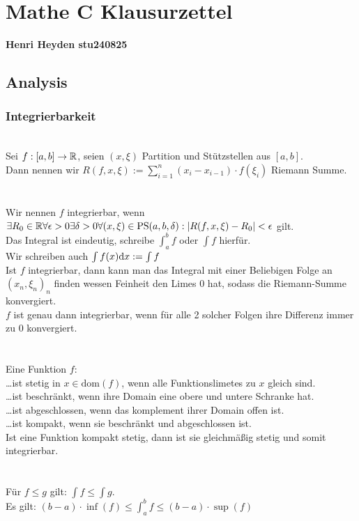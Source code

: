 


\section*{Mathe C Klausurzettel}
\textbf{Henri Heyden \gedanke stu240825}
\subsection*{Analysis}
\subsubsection*{Integrierbarkeit}
\\
Sei \(f : [a,b] \rightarrow \mathbb R\), seien \((x, \xi)\) Partition und Stützstellen aus \([a,b]\).\\
Dann nennen wir \(R(f,x,\xi) := \sum_{i=1}^n (x_i - x_{i-1}) \cdot f(\xi_i)\) Riemann Summe. \\ \\
\\
Wir nennen \(f\) integrierbar, wenn\\\(\exists R_0 \in \mathbb R \forall \epsilon > 0 \exists \delta > 0 \forall(x,\xi) \in \text{PS}(a,b,\delta): |R(f,x,\xi) - R_0| < \epsilon\) gilt. \\
Das Integral ist eindeutig, schreibe \(\int_{a}^{b} f\) oder \(\int f\) hierfür. \\
Wir schreiben auch \(\int f(x)\text dx := \int f\) \\
Ist \(f\) integrierbar, dann kann man das Integral mit einer Beliebigen Folge an \((x_n,\xi_n)_n\) finden wessen Feinheit den Limes 0 hat, sodass die Riemann-Summe konvergiert. \\
\(f\) ist genau dann integrierbar, wenn für alle 2 solcher Folgen ihre Differenz immer zu 0 konvergiert. \\ \\
 \\
Eine Funktion \(f\): \\
\dots ist stetig in \(x \in \text{dom}(f)\), wenn alle Funktionslimetes zu \(x\) gleich sind.\\
\dots ist beschränkt, wenn ihre Domain eine obere und untere Schranke hat. \\
\dots ist abgeschlossen, wenn das komplement ihrer Domain offen ist. \\
\dots ist kompakt, wenn sie beschränkt und abgeschlossen ist. \\
Ist eine Funktion kompakt stetig, dann ist sie gleichmäßig stetig und somit integrierbar. \\ \\
 \\
Für \(f \le g\) gilt: \(\int f \le \int g\). \\
Es gilt: \((b-a) \cdot \inf(f) \le \int_{a}^{b}f \le (b-a) \cdot \sup(f)\)
